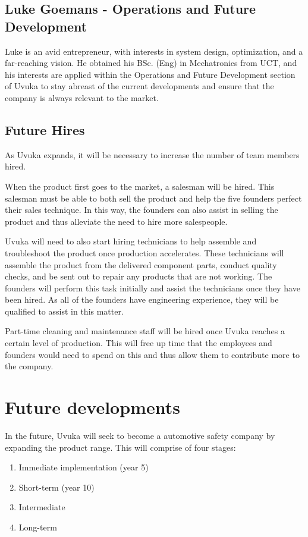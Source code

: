 \subsection{Luke Goemans - Operations and Future Development}
Luke is an avid entrepreneur, with interests in system design, optimization, and a far-reaching vision. He obtained his BSc. (Eng) in Mechatronics from UCT, and his interests are applied within the Operations and Future Development section of Uvuka to stay abreast of the current developments and ensure that the company is always relevant to the market.

\subsection{Future Hires}
As Uvuka expands, it will be necessary to increase the number of team members hired. 

When the product first goes to the market, a salesman will be hired. This salesman must be able to both sell the product and help the five founders perfect their sales technique. In this way, the founders can also assist in selling the product and thus alleviate the need to hire more salespeople.

Uvuka will need to also start hiring technicians to help assemble and troubleshoot the product once production accelerates. These technicians will assemble the product from the delivered component parts, conduct quality checks, and be sent out to repair any products that are not working. The founders will perform this task initially and assist the technicians once they have been hired. As all of the founders have engineering experience, they will be qualified to assist in this matter.

Part-time cleaning and maintenance staff will be hired once Uvuka reaches a certain level of production. This will free up time that the employees and founders would need to spend on this and thus allow them to contribute more to the company.

\section{Future developments}
In the future, Uvuka will seek to become a automotive safety company by expanding the product range. This will comprise of four stages:
\begin{enumerate}
\item Immediate implementation (year 5)
\item Short-term (year 10)
\item Intermediate
\item Long-term
\end{enumerate}

